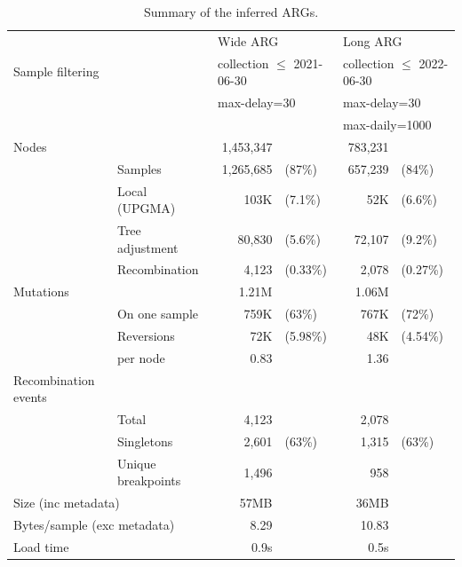 \documentclass{article}
\begin{document}
\begin{table}
\begin{center}
    \begin{tabular}{llrlrl}\toprule
        &  & \multicolumn{2}{l}{Wide ARG} & \multicolumn{2}{l}{Long ARG} \\
    \cmidrule{3-6}
    \multicolumn{2}{l}{Sample filtering}
             & \multicolumn{2}{l}{collection $\leq$ 2021-06-30}
                 & \multicolumn{2}{l}{collection $\leq$ 2022-06-30} \\
           & & \multicolumn{2}{l}{max-delay=30} & \multicolumn{2}{l}{max-delay=30} \\
        &  & &                               & \multicolumn{2}{l}{max-daily=1000} \\
    \midrule

    Nodes & & 1,453,347 & & 783,231  & \\
    & Samples & 1,265,685 & (87\%) & 657,239 & (84\%) \\
    & Local (UPGMA) & 103K & (7.1\%) & 52K & (6.6\%)  \\
    & Tree adjustment & 80,830 & (5.6\%) & 72,107 & (9.2\%) \\
    & Recombination & 4,123 & (0.33\%) & 2,078 & (0.27\%) \\
    \cmidrule{2-6}
    Mutations & & 1.21M &  & 1.06M & \\
    & On one sample & 759K & (63\%) & 767K & (72\%) \\
    & Reversions & 72K & (5.98\%) & 48K & (4.54\%) \\
    & per node & 0.83  &   & 1.36 \\
    \cmidrule{2-6}
    Recombination events & \\
    & Total & 4,123 & & 2,078 & \\
    & Singletons & 2,601  & (63\%) & 1,315 & (63\%) \\
    & Unique breakpoints & 1,496 &  & 958 & \\
    \cmidrule{2-6}
    \multicolumn{2}{l}{Size (inc metadata)} & 57MB & & 36MB&  \\
    \multicolumn{2}{l}{Bytes/sample (exc metadata)}  & 8.29  & & 10.83 \\
    Load time & & 0.9s & & 0.5s & \\
    \bottomrule
\end{tabular}
\end{center}

\caption{\label{tab:args}Summary of the inferred ARGs.
}
\end{table}
\end{document}
